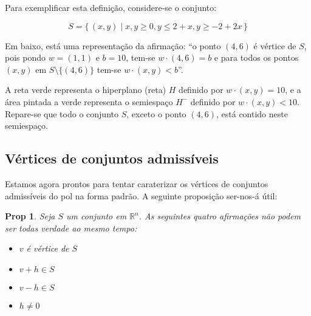 \documentclass{article}
\newcommand{\R}{\mathbb{R}}
\newtheorem{prop}{Prop}
\theoremstyle{definition}
\begin{document}
	Para exemplificar esta definição, considere-se o conjunto:
	
	\[S = \{\, (x,y) \mid x,y \geq 0, y \leq 2+x, y \geq -2 + 2x\,\}\]
	
	Em baixo, está uma representação da afirmação: ``o ponto $(4, 6)$ é vértice de $S$, pois pondo $w = (1,1)$ e $b = 10$, tem-se $w \cdot (4,6) = b$ e para todos os pontos $(x,y)$ em $S \setminus \{(4,6)\}$ tem-se $w \cdot (x,y) < b$''.
	
	
	A reta verde representa o hiperplano (reta) $H$ definido por ${w \cdot (x,y) = 10}$, e a área pintada a verde representa o semiespaço $H^-$ definido por ${w \cdot (x,y) < 10}$. Repare-se que todo o conjunto $S$, exceto o ponto $(4,6)$, está contido neste semiespaço.
	
	\subsection{Vértices de conjuntos admissíveis}
	
	Estamos agora prontos para tentar caraterizar os vértices de conjuntos admissíveis do pol na forma padrão. A seguinte proposição ser-nos-á útil:
	
	\begin{prop} \label{vertexvpmh}
	Seja $S$ um conjunto em $\R^n$. As seguintes quatro afirmações não podem ser todas verdade ao mesmo tempo:
	
	\begin{itemize}
	\item $v$ é vértice de $S$
	\item $v + h \in S$
	\item $v - h \in S$
	\item $h \neq 0$
	\end{itemize}
	\end{prop}
	
\end{document}
